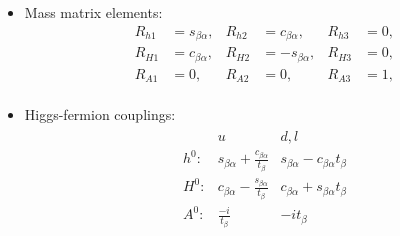 \documentclass[a4paper,12pt]{article}
\newcommand\cba{c_{\beta\alpha}}
\newcommand\sba{s_{\beta\alpha}}
\newcommand\tb{t_{\beta}}
\begin{document}
 
\begin{itemize}
    \item Mass matrix elements:
        \begin{align*}
            R_{h1} &= \sba, & R_{h2} &= \cba, & R_{h3} &= 0, \\
            R_{H1} &= \cba, & R_{H2} &= -\sba, & R_{H3} &= 0, \\
            R_{A1} &= 0, & R_{A2} &= 0, & R_{A3} &= 1, \\
        \end{align*}
    \item Higgs-fermion couplings:
        \begin{align*}
            \begin{matrix} 
                     & u & d,l \\
                h^0: & \sba+\frac{\cba}{\tb} & \sba-\cba\tb \\
                H^0: & \cba-\frac{\sba}{\tb} & \cba+\sba\tb \\
                A^0: & \frac{-i}{\tb} & -i\tb 
            \end{matrix}
        \end{align*}
\end{itemize}
\end{document}

